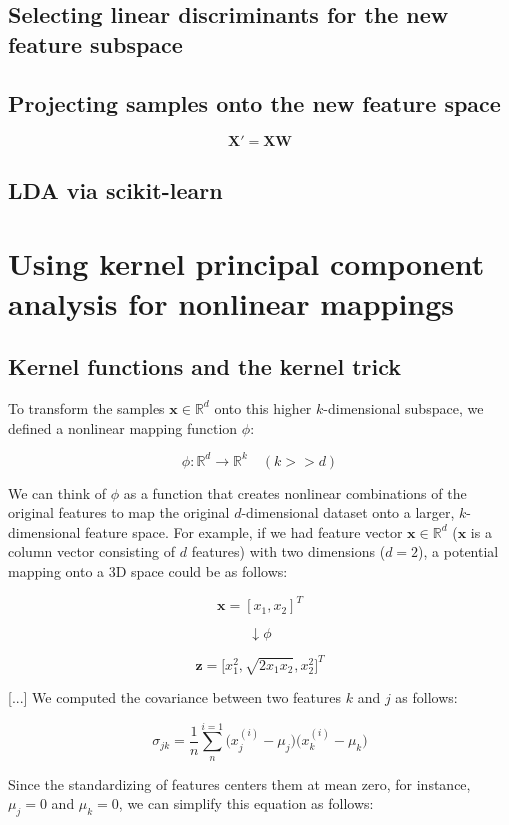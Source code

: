 \documentclass[letterpaper]{report}
\begin{document}
\subsection{Selecting linear discriminants for the new feature subspace}
\subsection{Projecting samples onto the new feature space}

\[
\mathbf{X'} = \mathbf{XW}
\]

\subsection{LDA via scikit-learn}
\section{Using kernel principal component analysis for nonlinear mappings}
\subsection{Kernel functions and the kernel trick}

To transform the samples $\mathbf{x} \in \mathbb{R}^d$ onto this higher $k$-dimensional subspace, we defined a nonlinear mapping function $\phi$:

\[
\phi : \mathbb{R}^d \rightarrow \mathbb{R}^k \quad (k >> d)
\]

We can think of $\phi$ as a function that creates nonlinear combinations of the original features to map the original $d$-dimensional dataset onto a larger, $k$-dimensional feature space. For example, if we had feature vector $\mathbf{x} \in \mathbb{R}^d$ ($\mathbf{x}$ is a column vector consisting of $d$ features) with two dimensions ($d=2$), a potential mapping onto a 3D space could be as follows:

\[
\mathbf{x} = [x_1, x_2]^T
\] 

\[
\downarrow \phi
\]

\[
\mathbf{z} = \bigg[  x_{1}^{2}, \sqrt{2x_1x_2}, x_{2}^{2}    \bigg]^T
\]
 
 [...] We computed the covariance between two features $k$ and $j$ as follows:
 
 \[
 \sigma_{jk} = \frac{1}{n} \sum_{n}^{i=1} \big( x_{j}^{(i)} - \mu_j \big) \big( x_{k}^{(i)} - \mu_k \big)
 \]
 
 Since the standardizing of features centers them at mean zero, for instance, $\mu_j = 0$ and $\mu_k = 0$, we can simplify this equation as follows:
 
\end{document}
